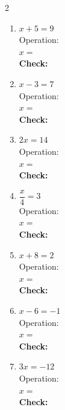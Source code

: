 \documentclass[12pt]{article}
\newcommand{\wspm}{\vspace{2.0cm}}
\newcommand{\sblank}{\underline{\hspace{1.4cm}}}
\begin{document}
\vspace{8pt}
\begin{multicols}{2}
\begin{enumerate}[label=\textbf{\arabic*.}, itemsep=0pt]

  \item $x + 5 = 9$\\[4pt]
  Operation: \sblank\\[4pt]
  $x = $ \sblank\\[4pt]
  \textbf{Check:} \underline{\hspace{3.5cm}}
  \wspm

  \item $x - 3 = 7$\\[4pt]
  Operation: \sblank\\[4pt]
  $x = $ \sblank\\[4pt]
  \textbf{Check:} \underline{\hspace{3.5cm}}
  \wspm

  \item $2x = 14$\\[4pt]
  Operation: \sblank\\[4pt]
  $x = $ \sblank\\[4pt]
  \textbf{Check:} \underline{\hspace{3.5cm}}
  \wspm

  \item $\dfrac{x}{4} = 3$\\[8pt]
  Operation: \sblank\\[4pt]
  $x = $ \sblank\\[4pt]
  \textbf{Check:} \underline{\hspace{3.5cm}}
  \wspm

  \item $x + 8 = 2$\\[4pt]
  Operation: \sblank\\[4pt]
  $x = $ \sblank\\[4pt]
  \textbf{Check:} \underline{\hspace{3.5cm}}
  \wspm

  \item $x - 6 = -1$\\[4pt]
  Operation: \sblank\\[4pt]
  $x = $ \sblank\\[4pt]
  \textbf{Check:} \underline{\hspace{3.5cm}}
  \wspm

  \item $3x = -12$\\[4pt]
  Operation: \sblank\\[4pt]
  $x = $ \sblank\\[4pt]
  \textbf{Check:} \underline{\hspace{3.5cm}}
  \wspm


\end{enumerate}
\end{multicols}
\end{document}
